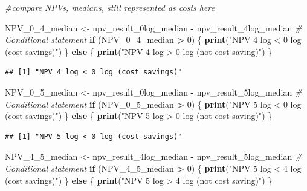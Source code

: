 \documentclass[
]{article}
\newenvironment{Shaded}{\begin{snugshade}}{\end{snugshade}}
\newcommand{\CommentTok}[1]{\textcolor[rgb]{0.56,0.35,0.01}{\textit{#1}}}
\newcommand{\ControlFlowTok}[1]{\textcolor[rgb]{0.13,0.29,0.53}{\textbf{#1}}}
\newcommand{\DecValTok}[1]{\textcolor[rgb]{0.00,0.00,0.81}{#1}}
\newcommand{\FunctionTok}[1]{\textcolor[rgb]{0.13,0.29,0.53}{\textbf{#1}}}
\newcommand{\NormalTok}[1]{#1}
\newcommand{\OtherTok}[1]{\textcolor[rgb]{0.56,0.35,0.01}{#1}}
\newcommand{\SpecialCharTok}[1]{\textcolor[rgb]{0.81,0.36,0.00}{\textbf{#1}}}
\newcommand{\StringTok}[1]{\textcolor[rgb]{0.31,0.60,0.02}{#1}}
\begin{document}
\begin{Shaded}
\begin{Highlighting}[]
\CommentTok{\#compare NPVs, medians, still represented as costs here}

\NormalTok{NPV\_0\_4\_median }\OtherTok{\textless{}{-}}\NormalTok{ npv\_result\_0log\_median }\SpecialCharTok{{-}}\NormalTok{ npv\_result\_4log\_median}
\CommentTok{\# Conditional statement}
\ControlFlowTok{if}\NormalTok{ (NPV\_0\_4\_median }\SpecialCharTok{\textgreater{}} \DecValTok{0}\NormalTok{) \{}
  \FunctionTok{print}\NormalTok{(}\StringTok{"NPV 4 log \textless{} 0 log (cost savings)"}\NormalTok{)}
\NormalTok{\} }\ControlFlowTok{else}\NormalTok{ \{}
  \FunctionTok{print}\NormalTok{(}\StringTok{"NPV 4 log \textgreater{} 0 log (not cost saving)"}\NormalTok{)}
\NormalTok{\}}
\end{Highlighting}
\end{Shaded}

\begin{verbatim}
## [1] "NPV 4 log < 0 log (cost savings)"
\end{verbatim}

\begin{Shaded}
\begin{Highlighting}[]
\NormalTok{NPV\_0\_5\_median }\OtherTok{\textless{}{-}}\NormalTok{ npv\_result\_0log\_median }\SpecialCharTok{{-}}\NormalTok{ npv\_result\_5log\_median}
\CommentTok{\# Conditional statement}
\ControlFlowTok{if}\NormalTok{ (NPV\_0\_5\_median }\SpecialCharTok{\textgreater{}} \DecValTok{0}\NormalTok{) \{}
  \FunctionTok{print}\NormalTok{(}\StringTok{"NPV 5 log \textless{} 0 log (cost savings)"}\NormalTok{)}
\NormalTok{\} }\ControlFlowTok{else}\NormalTok{ \{}
  \FunctionTok{print}\NormalTok{(}\StringTok{"NPV 5 log \textgreater{} 0 log (not cost saving)"}\NormalTok{)}
\NormalTok{\}}
\end{Highlighting}
\end{Shaded}

\begin{verbatim}
## [1] "NPV 5 log < 0 log (cost savings)"
\end{verbatim}

\begin{Shaded}
\begin{Highlighting}[]
\NormalTok{NPV\_4\_5\_median }\OtherTok{\textless{}{-}}\NormalTok{ npv\_result\_4log\_median }\SpecialCharTok{{-}}\NormalTok{ npv\_result\_5log\_median}
\CommentTok{\# Conditional statement}
\ControlFlowTok{if}\NormalTok{ (NPV\_4\_5\_median }\SpecialCharTok{\textgreater{}} \DecValTok{0}\NormalTok{) \{}
  \FunctionTok{print}\NormalTok{(}\StringTok{"NPV 5 log \textless{} 4 log (cost savings)"}\NormalTok{)}
\NormalTok{\} }\ControlFlowTok{else}\NormalTok{ \{}
  \FunctionTok{print}\NormalTok{(}\StringTok{"NPV 5 log \textgreater{} 4 log (not cost saving)"}\NormalTok{)}
\NormalTok{\}}
\end{Highlighting}
\end{Shaded}
\end{document}
